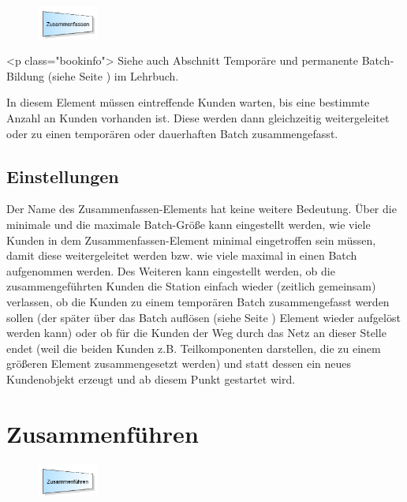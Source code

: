 \begin{figure}
\vspace{-22pt}
\includegraphics[width=2cm]{imageModelElementBatch.png}
\vspace{-22pt}
\end{figure}

<p class="bookinfo">
Siehe auch Abschnitt Temporäre und permanente Batch-Bildung (siehe Seite \pageref{ref:book:8.2.5}) im Lehrbuch.

In diesem Element müssen eintreffende Kunden warten, bis eine bestimmte Anzahl an Kunden vorhanden ist.
Diese werden dann gleichzeitig weitergeleitet oder zu einen temporären oder dauerhaften Batch zusammengefasst.

\subsection*{Einstellungen}

Der Name des Zusammenfassen-Elements hat keine weitere Bedeutung. Über die minimale und die maximale Batch-Größe kann
eingestellt werden, wie viele Kunden in dem Zusammenfassen-Element minimal eingetroffen sein müssen, damit diese 
weitergeleitet werden bzw. wie viele maximal in einen Batch aufgenommen werden. Des Weiteren kann eingestellt werden,
ob die zusammengeführten Kunden die Station einfach wieder (zeitlich gemeinsam) verlassen, ob die Kunden zu einem temporären
Batch zusammengefasst werden sollen (der später über das Batch auflösen (siehe Seite \pageref{ref:ModelElementSeparate}) Element
wieder aufgelöst werden kann) oder ob für die Kunden der Weg durch
das Netz an dieser Stelle endet (weil die beiden Kunden z.B. Teilkomponenten darstellen, die zu einem größeren Element
zusammengesetzt werden) und statt dessen ein neues Kundenobjekt erzeugt und ab diesem Punkt gestartet wird.


\section{Zusammenführen}
\label{ref:ModelElementMatch}

\begin{figure}
\vspace{-22pt}
\includegraphics[width=2cm]{imageModelElementMatch.png}
\vspace{-22pt}
\end{figure}

